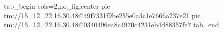  
 
 
 
 

\qqSecOrig


\ifcmt
  tab_begin cols=2,no_fig,center
    pic tm://15_12_22.16.30.48@49f7331f9be255e0a3c1e7666a237e21
    pic tm://15_12_22.16.30.48@0340496ea8c4970c4231eb4d88357fe7
  tab_end
\fi

